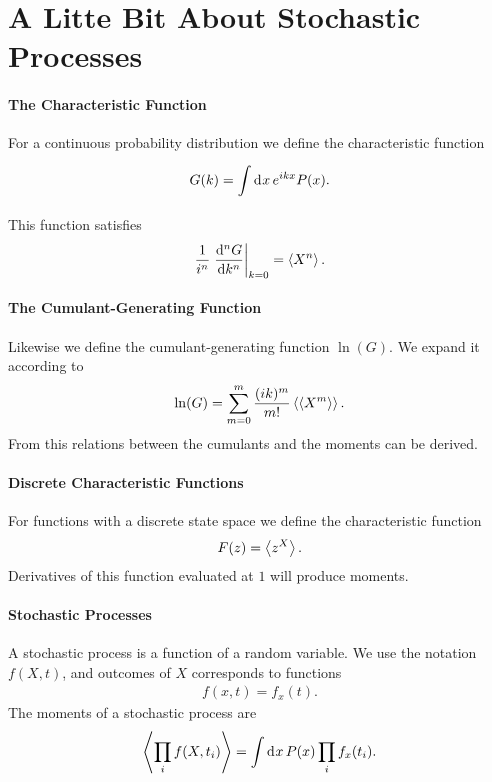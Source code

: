 \section{A Litte Bit About Stochastic Processes}

\paragraph{The Characteristic Function}
For a continuous probability distribution we define the characteristic function
\begin{align*}
	G(k) = \int\limits_{}^{}\dd[]{x}e^{ikx}P(x).
\end{align*}
This function satisfies
\begin{align*}
	\frac{1}{i^{n}}\eval{\dv[n]{G}{k}}_{k = 0} = \expval{X^{n}}.
\end{align*}

\paragraph{The Cumulant-Generating Function}
Likewise we define the cumulant-generating function $\ln(G)$. We expand it according to
\begin{align*}
	\ln(G) = \sum\limits_{m = 0}^{m}\frac{(ik)^{m}}{m!}\expval{\expval{X^{m}}}.
\end{align*}
From this relations between the cumulants and the moments can be derived.

\paragraph{Discrete Characteristic Functions}
For functions with a discrete state space we define the characteristic function
\begin{align*}
	F(z) = \expval{z^{X}}.
\end{align*}
Derivatives of this function evaluated at $1$ will produce moments.

\paragraph{Stochastic Processes}
A stochastic process is a function of a random variable. We use the notation $f(X, t)$, and outcomes of $X$ corresponds to functions
\begin{align*}
	f(x, t) = f_{x}(t).
\end{align*}
The moments of a stochastic process are
\begin{align*}
	\expval{\prod\limits_{i}f(X, t_{i})} = \int\limits_{}^{}\dd[]{x}P(x)\prod\limits_{i}f_{x}(t_{i}).
\end{align*}


